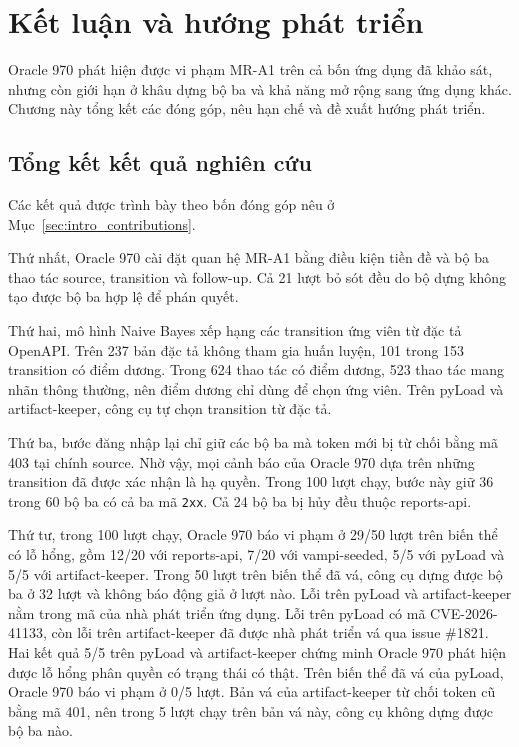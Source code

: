 \chapter{Kết luận và hướng phát triển}
\label{chap:conclusion}

Oracle 970 phát hiện được vi phạm MR-A1 trên cả bốn ứng dụng đã khảo sát, nhưng còn giới hạn ở khâu dựng bộ ba và khả năng mở rộng sang ứng dụng khác. Chương này tổng kết các đóng góp, nêu hạn chế và đề xuất hướng phát triển.

\section{Tổng kết kết quả nghiên cứu}
\label{sec:conclusion_summary}

Các kết quả được trình bày theo bốn đóng góp nêu ở Mục~\ref{sec:intro_contributions}.

Thứ nhất, Oracle 970 cài đặt quan hệ MR-A1 bằng điều kiện tiền đề và bộ ba thao tác source, transition và follow-up. Cả 21 lượt bỏ sót đều do bộ dựng không tạo được bộ ba hợp lệ để phán quyết.

Thứ hai, mô hình Naive Bayes xếp hạng các transition ứng viên từ đặc tả OpenAPI. Trên 237 bản đặc tả không tham gia huấn luyện, 101 trong 153 transition có điểm dương. Trong 624 thao tác có điểm dương, 523 thao tác mang nhãn thông thường, nên điểm dương chỉ dùng để chọn ứng viên. Trên pyLoad và artifact-keeper, công cụ tự chọn transition từ đặc tả.

Thứ ba, bước đăng nhập lại chỉ giữ các bộ ba mà token mới bị từ chối bằng mã 403 tại chính source. Nhờ vậy, mọi cảnh báo của Oracle 970 dựa trên những transition đã được xác nhận là hạ quyền. Trong 100 lượt chạy, bước này giữ 36 trong 60 bộ ba có cả ba mã \texttt{2xx}. Cả 24 bộ ba bị hủy đều thuộc reports-api.

Thứ tư, trong 100 lượt chạy, Oracle 970 báo vi phạm ở 29/50 lượt trên biến thể có lỗ hổng, gồm 12/20 với reports-api, 7/20 với vampi-seeded, 5/5 với pyLoad và 5/5 với artifact-keeper. Trong 50 lượt trên biến thể đã vá, công cụ dựng được bộ ba ở 32 lượt và không báo động giả ở lượt nào. Lỗi trên pyLoad và artifact-keeper nằm trong mã của nhà phát triển ứng dụng. Lỗi trên pyLoad có mã \mbox{CVE-2026-41133}, còn lỗi trên artifact-keeper đã được nhà phát triển vá qua issue \#1821. Hai kết quả 5/5 trên pyLoad và artifact-keeper chứng minh Oracle 970 phát hiện được lỗ hổng phân quyền có trạng thái có thật. Trên biến thể đã vá của pyLoad, Oracle 970 báo vi phạm ở 0/5 lượt. Bản vá của artifact-keeper từ chối token cũ bằng mã 401, nên trong 5 lượt chạy trên bản vá này, công cụ không dựng được bộ ba nào.

